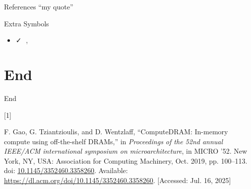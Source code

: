 \documentclass[
  ignorenonframetext,
  twocolumn]{beamer}
\newlength{\cslhangindent}
\newlength{\csllabelwidth}
\newenvironment{CSLReferences}[2] %
 {\begin{list}{}{%
  \setlength{\itemindent}{0pt}
  \setlength{\leftmargin}{0pt}
  \setlength{\parsep}{0pt}
  \ifodd #1
   \setlength{\leftmargin}{\cslhangindent}
   \setlength{\itemindent}{-1\cslhangindent}
  \fi
  \setlength{\itemsep}{#2\baselineskip}}}
 {\end{list}}
\newcommand{\CSLLeftMargin}[1]{\parbox[t]{\csllabelwidth}{\strut#1\strut}}
\newcommand{\CSLRightInline}[1]{\parbox[t]{\linewidth - \csllabelwidth}{\strut#1\strut}}
\providecommand{\tightlist}{%
  \setlength{\itemsep}{0pt}\setlength{\parskip}{0pt}}
\newcommand{\emoji}[1]{{\emojiFont #1}}
\newcommand{\fallback}[1]{{\fallbackFont #1}}
\begin{document}
\begin{frame}{References}
\protect{}\label{references}
``my quote'' 
\end{frame}

\begin{frame}{Extra Symbols}
\protect{}\label{extra-symbols}
\begin{itemize}
\tightlist
\item
  \fallback{✓} \emoji{🧠}, \emoji{📙}
\end{itemize}
\end{frame}

\section{End}\label{end}

\begin{frame}{End}
\protect{}\label{refs}
\begin{CSLReferences}{0}{0}
\CSLLeftMargin{{[}1{]} }%
\CSLRightInline{F. Gao, G. Tziantzioulis, and D. Wentzlaff,
{``ComputeDRAM: In-memory compute using off-the-shelf DRAMs,''} in
\emph{Proceedings of the 52nd annual IEEE/ACM international symposium on
microarchitecture}, in MICRO '52. New York, NY, USA: Association for
Computing Machinery, Oct. 2019, pp. 100--113. doi:
\href{https://doi.org/10.1145/3352460.3358260}{10.1145/3352460.3358260}.
Available: \url{https://dl.acm.org/doi/10.1145/3352460.3358260}.
{[}Accessed: Jul. 16, 2025{]}}

\end{CSLReferences}
\end{frame}
\end{document}
